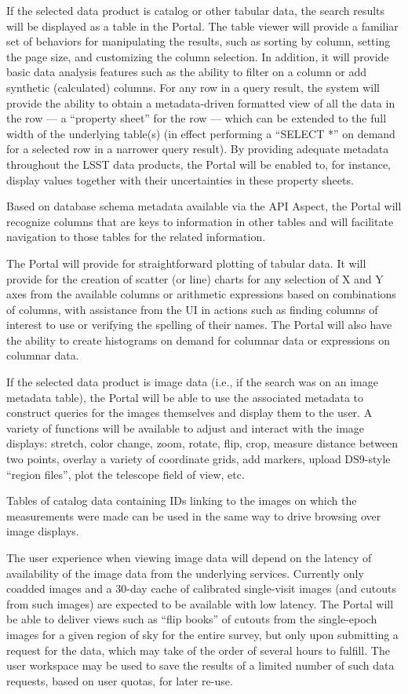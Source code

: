 If the selected data product is catalog or other tabular data, the search results will be displayed as a table in the Portal.
The table viewer will provide a familiar set of behaviors for manipulating the results, such as sorting by column, setting the page size, and customizing the column selection.
In addition, it will provide basic data analysis features such as the ability to filter on a column or add synthetic (calculated) columns.
For any row in a query result, the system will provide the ability to obtain a metadata-driven formatted view of all the data in the row --- a ``property sheet'' for the row --- which can be extended to the full width of the underlying table(s) (in effect performing a ``SELECT *'' on demand for a selected row in a narrower query result).
By providing adequate metadata throughout the LSST data products, the Portal will be enabled to, for instance, display values together with their uncertainties in these property sheets.

Based on database schema metadata available via the API Aspect, the Portal will recognize columns that are keys to information in other tables and will facilitate navigation to those tables for the related information.

The Portal will provide for straightforward plotting of tabular data.
It will provide for the creation of scatter (or line) charts for any selection of X and Y axes from the available columns or arithmetic expressions based on combinations of columns, with assistance from the UI in actions such as finding columns of interest to use or verifying the spelling of their names.
The Portal will also have the ability to create histograms on demand for columnar data or expressions on columnar data.

If the selected data product is image data (i.e., if the search was on an image metadata table), the Portal will be able to use the associated metadata to construct queries for the images themselves and display them to the user.
A variety of functions will be available to adjust and interact with the image displays: stretch, color change, zoom, rotate, flip, crop, measure distance between two points, overlay a variety of coordinate grids, add markers, upload DS9-style ``region files'', plot the telescope field of view, etc.

Tables of catalog data containing IDs linking to the images on which the measurements were made can be used in the same way to drive browsing over image displays.

The user experience when viewing image data will depend on the latency of availability of the image data from the underlying services.
Currently only coadded images and a 30-day cache of calibrated single-visit images (and cutouts from such images) are expected to be available with low latency.
The Portal will be able to deliver views such as ``flip books'' of cutouts from the single-epoch images for a given region of sky for the entire survey, but only upon submitting a request for the data, which may take of the order of several hours to fulfill.
The user workspace may be used to save the results of a limited number of such data requests, based on user quotas, for later re-use.

